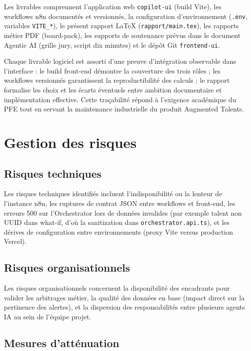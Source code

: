 Les livrables comprennent l'application web \texttt{copilot-ui} (build Vite), les workflows n8n documentés et versionnés, la configuration d'environnement (\texttt{.env}, variables \texttt{VITE\_*}), le présent rapport LaTeX (\texttt{rapport/main.tex}), les rapports métier PDF (board-pack), les supports de soutenance prévus dans le document Agentic AI (grille jury, script dix minutes) et le dépôt Git \texttt{frontend-ui}.

Chaque livrable logiciel est assorti d'une preuve d'intégration observable dans l'interface : le build front-end démontre la couverture des trois rôles ; les workflows versionnés garantissent la reproductibilité des calculs ; le rapport formalise les choix et les écarts éventuels entre ambition documentaire et implémentation effective. Cette traçabilité répond à l'exigence académique du PFE tout en servant la maintenance industrielle du produit Augmented Talents.

\section{Gestion des risques}

\subsection{Risques techniques}

Les risques techniques identifiés incluent l'indisponibilité ou la lenteur de l'instance n8n, les ruptures de contrat JSON entre workflows et front-end, les erreurs 500 sur l'Orchestrator lors de données invalides (par exemple talent non UUID dans what-if, d'où la sanitization dans \texttt{orchestrator.api.ts}), et les dérives de configuration entre environnements (proxy Vite versus production Vercel).

\subsection{Risques organisationnels}

Les risques organisationnels concernent la disponibilité des encadrants pour valider les arbitrages métier, la qualité des données en base (impact direct sur la pertinence des alertes), et la dispersion des responsabilités entre plusieurs agents IA au sein de l'équipe projet.

\subsection{Mesures d'atténuation}

